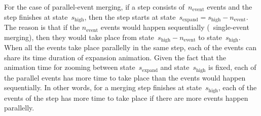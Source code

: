 \documentclass[ijgi,article,submit,moreauthors,pdftex]{Definitions/mdpi}
\begin{document}
For the case of parallel-event merging,
if a step consists of~$n_\mathrm{event}$ events and 
the step finishes at state~$s_\mathrm{high}$, then the step starts 
at state~$s_\mathrm{expand}=s_\mathrm{high} - n_\mathrm{event}$.
The reason is that if the $n_\mathrm{event}$ events 
would happen sequentially (\ie~single-event merging),
then they would take place 
from state~$s_\mathrm{high} - n_\mathrm{event}$ to state~$s_\mathrm{high}$.
When all the events take place parallelly in the same step, 
each of the events can share
its time duration of expansion animation.
Given the fact that the animation time for zooming 
between state~$s_\mathrm{expand}$ and state~$s_\mathrm{high}$ is fixed,
each of the parallel events has more time to take place
than the events would happen sequentially.
In other words, for a merging step finishes at state~$s_\mathrm{high}$,
each of the events of the step has more time to take place 
if there are more events happen parallelly.
\end{document}
